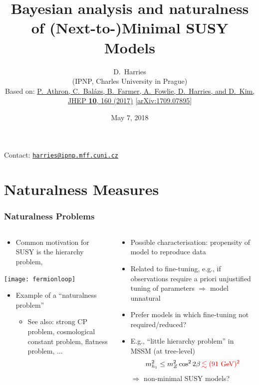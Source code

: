 \documentclass[10pt,aspectratio=169]{beamer}
\title{Bayesian analysis and naturalness of (Next-to-)Minimal SUSY Models}
\author{D.~Harries\\
  {\scriptsize
    (IPNP, Charles University in Prague)}\\
  \vspace{25pt}
  { \scriptsize
    Based on: \href{https://doi.org/10.1007/JHEP10(2017)160}{%
      P.~Athron, C.~Bal\'{a}zs, B.~Farmer, A.~Fowlie, D.~Harries,
      and D.~Kim, JHEP \textbf{10}, 160 (2017)}
    [\href{http://arxiv.org/abs/1709.07895}{arXiv:1709.07895}]
  }
}
\date[Phenomenology 2018, University of Pittsburgh]{May 7, 2018}
\begin{document}
\begin{frame}[plain]
  \titlepage
   Contact: \href{mailto:harries@ipnp.mff.cuni.cz}{%
    \texttt{harries@ipnp.mff.cuni.cz}}
\end{frame}

\section{Naturalness Measures}

\begin{frame}
  \frametitle{Naturalness Problems}
  \begin{columns}[t]
    \begin{column}{0.5\textwidth}
      \begin{itemize} \itemsep1em
        \item Common motivation for SUSY is the hierarchy problem,
      \end{itemize}
      \begin{center}
        \texttt{[image: fermionloop]}
      \end{center}
      \begin{itemize} \itemsep1em
      \item Example of a \alert{``naturalness problem''}
        \begin{itemize}
        \item See also: strong CP problem, cosmological constant
          problem, flatness problem, $\ldots$
        \end{itemize}
      \end{itemize}
    \end{column}
    \begin{column}{0.5\textwidth}
      \begin{itemize} \itemsep1.5em
      \item Possible characterisation: {\color{blue} propensity of model to
        reproduce data}
      \item Related to \alert{fine-tuning}, e.g., if observations require
        a priori unjustified tuning of parameters $\Rightarrow$ model
        unnatural
      \item Prefer models in which fine-tuning not required/reduced?
      \item E.g., ``little hierarchy problem'' in MSSM
        (at tree-level)
        \begin{equation*}
          m_{h_1}^2 \leq m_Z^2 \cos^2 2\beta \, { \color{red} \lesssim
            (91 \text{ GeV})^2}
        \end{equation*}
        {\color{blue} $\Rightarrow$ non-minimal SUSY models?}
      \end{itemize}
    \end{column}
  \end{columns}
\end{frame}
\end{document}
